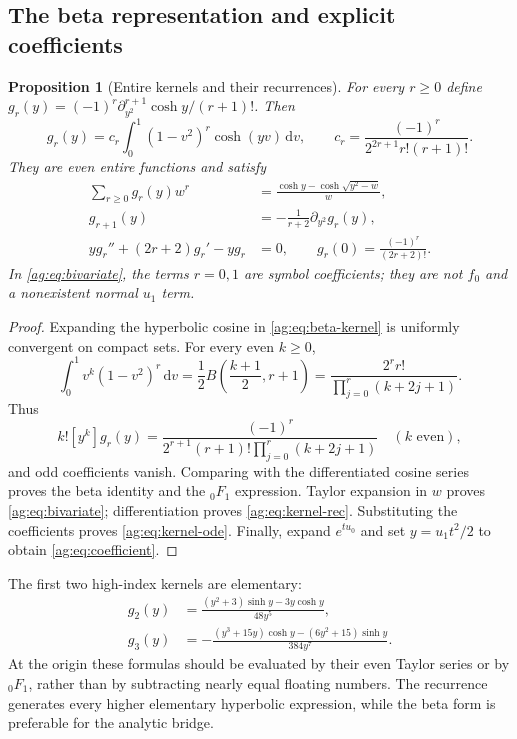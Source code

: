 \documentclass[11pt,letterpaper]{article}
\numberwithin{equation}{section}
\newtheorem{proposition}[theorem]{Proposition}
\theoremstyle{definition}\newtheorem{definition}[theorem]{Definition}
\theoremstyle{remark}\newtheorem{remark}[theorem]{Remark}
\newcommand{\dd}{\,\mathrm d}\newcommand{\ii}{\mathrm i}
\newcommand{\piy}{\partial_{y^2}}
\begin{document}
\subsection{The beta representation and explicit coefficients}
\begin{proposition}[Entire kernels and their recurrences]\label{ag:prop:kernel}
For every $r\ge0$ define
$g_r(y)=(-1)^r\piy^{r+1}\cosh y/(r+1)!$. Then
\begin{equation}\label{ag:eq:beta-kernel}
 g_r(y)=c_r\int_0^1(1-v^2)^r\cosh(yv)\dd v,
 \qquad c_r=\frac{(-1)^r}{2^{2r+1}r!(r+1)!}.
\end{equation}
They are even entire functions and satisfy
\begin{align}
 \sum_{r\ge0}g_r(y)w^r
   &=\frac{\cosh y-\cosh\sqrt{y^2-w}}{w},
       \label{ag:eq:bivariate}\\
 g_{r+1}(y)&=-\frac1{r+2}\piy g_r(y),
       \label{ag:eq:kernel-rec}\\
 yg_r''+(2r+2)g_r'-yg_r&=0,
 \qquad g_r(0)=\frac{(-1)^r}{(2r+2)!}.
       \label{ag:eq:kernel-ode}
\end{align}
In \eqref{ag:eq:bivariate}, the terms $r=0,1$ are symbol coefficients;
they are not $f_0$ and a nonexistent normal $u_1$ term.
\end{proposition}
\begin{proof}
Expanding the hyperbolic cosine in \eqref{ag:eq:beta-kernel} is uniformly
convergent on compact sets. For every even $k\ge0$,
\[
 \int_0^1v^k(1-v^2)^r\dd v
 =\frac12 B\left(\frac{k+1}{2},r+1\right)
 =\frac{2^r r!}{\prod_{j=0}^r(k+2j+1)}.
\]
Thus
\begin{equation}\label{ag:eq:kernel-coeff}
 k![y^k]g_r(y)=
 \frac{(-1)^r}{2^{r+1}(r+1)!\prod_{j=0}^r(k+2j+1)}
 \quad(k\text{ even}),
\end{equation}
and odd coefficients vanish. Comparing with the differentiated cosine
series proves the beta identity and the ${}_0F_1$ expression.
Taylor expansion in $w$ proves \eqref{ag:eq:bivariate}; differentiation
proves \eqref{ag:eq:kernel-rec}. Substituting the coefficients proves
\eqref{ag:eq:kernel-ode}. Finally, expand $e^{tu_0}$ and set
$y=u_1t^2/2$ to obtain \eqref{ag:eq:coefficient}.
\end{proof}

The first two high-index kernels are elementary:
\begin{align}
 g_2(y)&=\frac{(y^2+3)\sinh y-3y\cosh y}{48y^5},
       \label{ag:eq:g2}\\
 g_3(y)&=-\frac{(y^3+15y)\cosh y-(6y^2+15)\sinh y}{384y^7}.
       \label{ag:eq:g3}
\end{align}
At the origin these formulas should be evaluated by their even Taylor
series or by ${}_0F_1$, rather than by subtracting nearly equal floating
numbers. The recurrence generates every higher elementary hyperbolic
expression, while the beta form is preferable for the analytic bridge.
\end{document}
